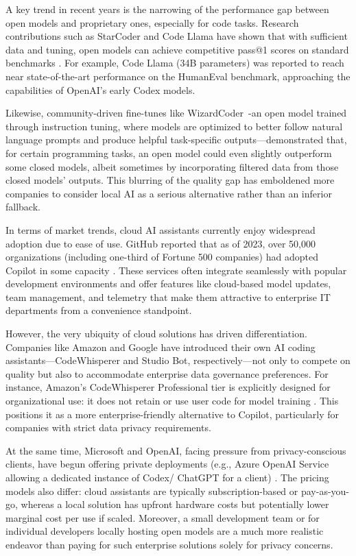 A key trend in recent years is the narrowing of the performance gap between open models and proprietary ones, especially for code tasks. Research contributions such as StarCoder and Code Llama have shown that with sufficient data and tuning, open models can achieve competitive pass@1 scores on standard benchmarks \autocite{Li2023StarCoder}. For example, Code Llama (34B parameters) was reported to reach near state-of-the-art performance on the HumanEval benchmark, approaching the capabilities of OpenAI’s early Codex models.

Likewise, community-driven fine-tunes like WizardCoder~\autocite{Luo2023}-an open model trained through instruction tuning, where models are optimized to better follow natural language prompts and produce helpful task-specific outputs—demonstrated that, for certain programming tasks, an open model could even slightly outperform some closed models, albeit sometimes by incorporating filtered data from those closed models’ outputs. This blurring of the quality gap has emboldened more companies to consider local \gls{AI} as a serious alternative rather than an inferior fallback.

In terms of market trends, cloud \gls{AI} assistants currently enjoy widespread adoption due to ease of use. GitHub reported that as of 2023, over 50,000 organizations (including one-third of Fortune 500 companies) had adopted Copilot in some capacity \autocite{Opsera2024}. These services often integrate seamlessly with popular development environments and offer features like cloud-based model updates, team management, and telemetry that make them attractive to enterprise IT departments from a convenience standpoint.

However, the very ubiquity of cloud solutions has driven differentiation. Companies like Amazon and Google have introduced their own \gls{AI} coding assistants—CodeWhisperer and Studio Bot, respectively—not only to compete on quality but also to accommodate enterprise data governance preferences. For instance, Amazon’s CodeWhisperer Professional tier is explicitly designed for organizational use: it does not retain or use user code for model training \autocite{AWSCodeWhispererDataSharing,AWSCodeWhispererDashboard}. This positions it as a more enterprise-friendly alternative to Copilot, particularly for companies with strict data privacy requirements.

At the same time, Microsoft and OpenAI, facing pressure from privacy-conscious clients, have begun offering private deployments (e.g., Azure OpenAI Service allowing a dedicated instance of Codex/ ChatGPT for a client) \autocite{MicrosoftAzureOpenAIPrivateDeployment}. The pricing models also differ: cloud assistants are typically subscription-based or pay-as-you-go, whereas a local solution has upfront hardware costs but potentially lower marginal cost per use if scaled. Moreover, a small development team or for individual developers locally hosting open models are a much more realistic endeavor than paying for such enterprise solutions solely for privacy concerns.

